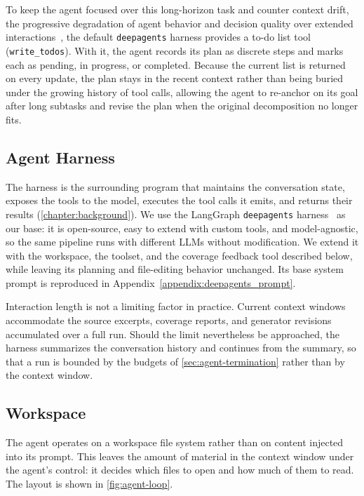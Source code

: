 To keep the agent focused over this long-horizon task and counter context drift, the progressive degradation of agent behavior and decision quality over extended interactions~\cite{rathAgentDriftQuantifying2026}, the default \texttt{deepagents} harness provides a to-do list tool (\texttt{write\_todos}).
With it, the agent records its plan as discrete steps and marks each as pending, in progress, or completed.
Because the current list is returned on every update, the plan stays in the recent context rather than being buried under the growing history of tool calls, allowing the agent to re-anchor on its goal after long subtasks and revise the plan when the original decomposition no longer fits.

\subsection{Agent Harness}
\label{sec:agent-harness}

The harness is the surrounding program that maintains the conversation state, exposes the tools to the model, executes the tool calls it emits, and returns their results (\cref{chapter:background}).
We use the LangGraph \texttt{deepagents} harness~\cite{DeepAgentsOpen} as our base: it is open-source, easy to extend with custom tools, and model-agnostic, so the same pipeline runs with different \acp{LLM} without modification.
We extend it with the workspace, the toolset, and the coverage feedback tool described below, while leaving its planning and file-editing behavior unchanged.
Its base system prompt is reproduced in Appendix~\ref{appendix:deepagents_prompt}.

Interaction length is not a limiting factor in practice.
Current context windows accommodate the source excerpts, coverage reports, and generator revisions accumulated over a full run.
Should the limit nevertheless be approached, the harness summarizes the conversation history and continues from the summary, so that a run is bounded by the budgets of \cref{sec:agent-termination} rather than by the context window.

\subsection{Workspace}
\label{sec:agent-workspace}

The agent operates on a workspace file system rather than on content injected into its prompt.
This leaves the amount of material in the context window under the agent's control: it decides which files to open and how much of them to read.
The layout is shown in \cref{fig:agent-loop}.


